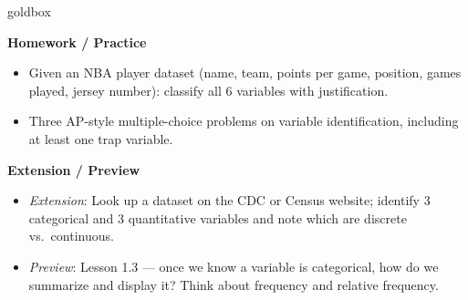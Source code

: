\documentclass[10pt]{article}
\begin{document}
\begin{skillbox}{goldbox}
\begin{minipage}[t]{0.48\linewidth}
    \textbf{Homework / Practice}
    \begin{itemize}
        \item Given an NBA player dataset (name, team, points per game, position,
              games played, jersey number): classify all 6 variables with
              justification.
        \item Three AP-style multiple-choice problems on variable identification,
              including at least one trap variable.
    \end{itemize}
\end{minipage}
\hfill
\begin{minipage}[t]{0.48\linewidth}
    \textbf{Extension / Preview}
    \begin{itemize}
        \item \textit{Extension}: Look up a dataset on the CDC or Census website;
              identify 3 categorical and 3 quantitative variables and note which
              are discrete vs.\ continuous.
        \item \textit{Preview}: Lesson 1.3 --- once we know a variable is
              categorical, how do we summarize and display it? Think about
              frequency and relative frequency.
    \end{itemize}
\end{minipage}
\end{skillbox}
\end{document}
